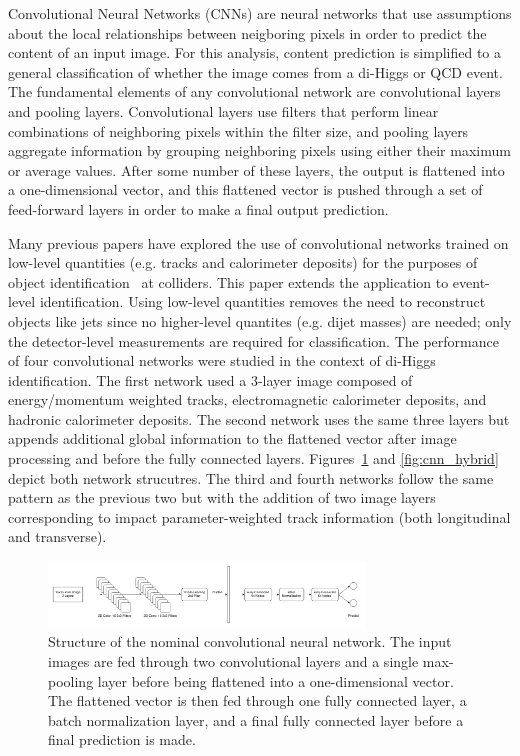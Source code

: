 \label{sec:CNN}
Convolutional Neural Networks (CNNs) are neural networks that use assumptions about the local relationships between neigboring pixels in order to predict the content of an input image. For this analysis, content prediction is simplified to a general classification of whether the image comes from a di-Higgs or QCD event. The fundamental elements of any convolutional network are convolutional layers and pooling layers. Convolutional layers use filters that perform linear combinations of neighboring pixels within the filter size, and pooling layers aggregate information by grouping neighboring pixels using either their maximum or average values. After some number of these layers, the output is flattened into a one-dimensional vector, and this flattened vector is pushed through a set of feed-forward layers in order to make a final output prediction. 

Many previous papers have explored the use of convolutional networks trained on low-level quantities (e.g. tracks and calorimeter deposits) for the purposes of object identification~\cite{Alison:2019kud} at colliders. This paper extends the application to event-level identification. Using low-level quantities removes the need to reconstruct objects like jets since no higher-level quantites (e.g. dijet masses) are needed; only the detector-level measurements are required for classification. The performance of four convolutional networks were studied in the context of di-Higgs identification. The first network used a 3-layer image composed of energy/momentum weighted tracks, electromagnetic calorimeter deposits, and hadronic calorimeter deposits. The second network uses the same three layers but appends additional global information to the flattened vector after image processing and before the fully connected layers. Figures~\ref{fig:cnn_nominal} and \ref{fig:cnn_hybrid} depict both network strucutres. The third and fourth networks follow the same pattern as the previous two but with the addition of two image layers corresponding to impact parameter-weighted track information (both longitudinal and transverse).

\begin{figure}[!h] 
\begin{center}
\includegraphics*[width=0.75\textwidth] {CNN/figures/nominalCNN.png}
\caption{Structure of the nominal convolutional neural network. The input images are fed through two convolutional layers and a single max-pooling layer before being flattened into a one-dimensional vector. The flattened vector is then fed through one fully connected layer, a batch normalization layer, and a final fully connected layer before a final prediction is made.}
  \label{fig:cnn_nominal}
\end{center}
\end{figure}

